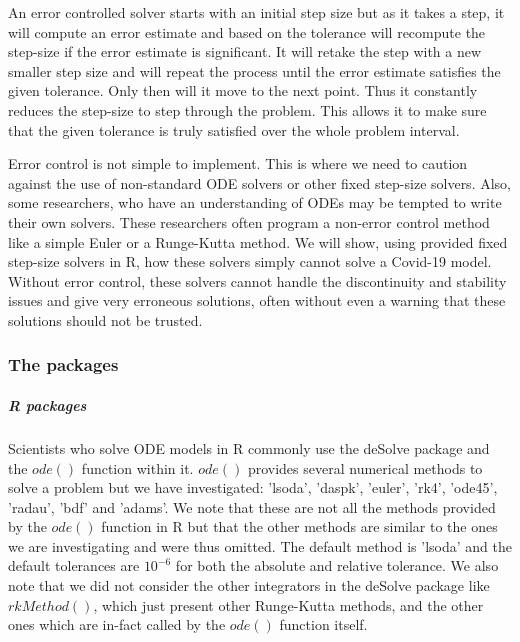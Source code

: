 An error controlled solver starts with an initial step size but as it takes a step, it will compute an error estimate and based on the tolerance will recompute the step-size if the error estimate is significant. It will retake the step with a new smaller step size and will repeat the process until the error estimate satisfies the given tolerance. Only then will it move to the next point. Thus it constantly reduces the step-size to step through the problem. This allows it to make sure that the given tolerance is truly satisfied over the whole problem interval.

Error control is not simple to implement. This is where we need to caution against the use of non-standard ODE solvers or other fixed step-size solvers. Also, some researchers, who have an understanding of ODEs may be tempted to write their own solvers. These researchers often program a non-error control method like a simple Euler or a Runge-Kutta method. We will show, using provided fixed step-size solvers in R, how these solvers simply cannot solve a Covid-19 model. Without error control, these solvers cannot handle the discontinuity and stability issues and give very erroneous solutions, often without even a warning that these solutions should not be trusted.

\subsubsection{The packages}
\label{subsection:numerical_software_used}
\subparagraph{R packages}
Scientists who solve ODE models in R commonly use the deSolve package and the $ode()$ function within it.
$ode()$ provides several numerical methods to solve a problem but we have investigated: 'lsoda', 'daspk', 'euler', 'rk4', 'ode45', 'radau', 'bdf' and 'adams'. We note that these are not all the methods provided by the $ode()$ function in R but that the other methods are similar to the ones we are investigating and were thus omitted. The default method is 'lsoda' and the default tolerances are $10^{-6}$ for both the absolute and relative tolerance. We also note that we did not consider the other integrators in the deSolve package like $rkMethod()$, which just present other Runge-Kutta methods, and the other ones which are in-fact called by the $ode()$ function itself.


